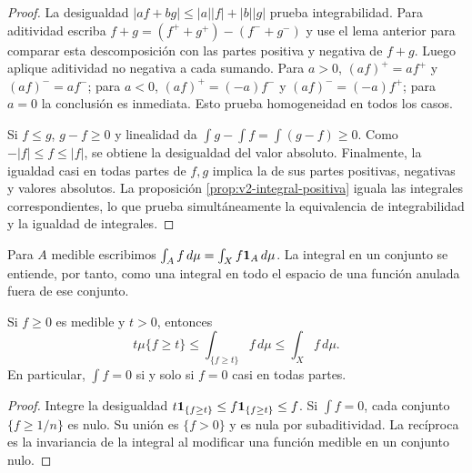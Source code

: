 \begin{proof}
La desigualdad $|af+bg|\le|a||f|+|b||g|$ prueba integrabilidad. Para aditividad escriba $f+g=(f^++g^+)-(f^-+g^-)$ y use el lema anterior para comparar esta descomposición con las partes positiva y negativa de $f+g$. Luego aplique aditividad no negativa a cada sumando. Para $a>0$, $(af)^+=af^+$ y $(af)^-=af^-$; para $a<0$, $(af)^+=(-a)f^-$ y $(af)^-=(-a)f^+$; para $a=0$ la conclusión es inmediata. Esto prueba homogeneidad en todos los casos.

Si $f\le g$, $g-f\ge0$ y linealidad da $\int g-\int f=\int(g-f)\ge0$. Como $- |f|\le f\le|f|$, se obtiene la desigualdad del valor absoluto. Finalmente, la igualdad casi en todas partes de $f,g$ implica la de sus partes positivas, negativas y valores absolutos. La proposición \ref{prop:v2-integral-positiva} iguala las integrales correspondientes, lo que prueba simultáneamente la equivalencia de integrabilidad y la igualdad de integrales.
\end{proof}
Para $A$ medible escribimos $\int_Af\,d\mu=\int_Xf\mathbf1_{A}\,d\mu$. La integral en un conjunto se entiende, por tanto, como una integral en todo el espacio de una función anulada fuera de ese conjunto.

\begin{proposicion}\label{prop:v2-markov}
Si $f\ge0$ es medible y $t>0$, entonces
\[t\mu\{f\ge t\}\le\int_{\{f\ge t\}}f\,d\mu\le\int_Xf\,d\mu.\]
En particular, $\int f=0$ si y solo si $f=0$ casi en todas partes.
\end{proposicion}
\begin{proof}
Integre la desigualdad $t\mathbf1_{\{f\ge t\}}\le f\mathbf1_{\{f\ge t\}}\le f$. Si $\int f=0$, cada conjunto $\{f\ge1/n\}$ es nulo. Su unión es $\{f>0\}$ y es nula por subaditividad. La recíproca es la invariancia de la integral al modificar una función medible en un conjunto nulo.
\end{proof}

